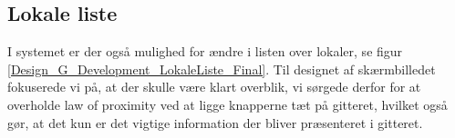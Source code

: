 \subsection{Lokale liste}
I systemet er der også mulighed for ændre i listen over lokaler, se figur \ref{Design_G_Development_LokaleListe_Final}. Til designet af skærmbilledet fokuserede vi på, at der skulle være klart overblik, vi sørgede derfor for at overholde law of proximity ved at ligge knapperne tæt på gitteret, hvilket også gør, at det kun er det vigtige information der bliver præsenteret i gitteret.

